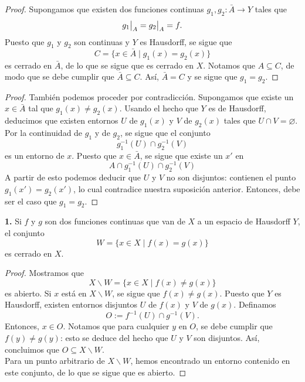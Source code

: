 \documentclass{article}
\newcommand\restr[2]{{%
		\left.\kern-\nulldelimiterspace %
		#1 %
		\vphantom{\big|} %
		\right|_{#2} %
}}
\begin{document}
\begin{proof}
Supongamos que existen dos funciones continuas $g_{1}, g_{2}: \bar{A} \rightarrow Y$ tales que
	$$ \restr{g_{1}}{A} = \restr{g_{2}}{A} = f.  $$
	Puesto que $g_{1}$ y $g_{2}$ son continuas y $Y$ es Hausdorff, se sigue que
	$$ C = \{ x \in \bar{A} \mid g_{1}(x) = g_{2}(x) \} $$
	es cerrado en $\bar{A}$, de lo que se sigue que es cerrado en $X$. Notamos que $A \subseteq C$, de modo que se debe cumplir que $\bar{A} \subseteq C$. Así, $\bar{A} = C$ y se sigue que $g_{1} = g_{2}$.
\end{proof}

\begin{proof}
	También podemos proceder por contradicción. Supongamos que existe un $x \in \bar{A}$ tal que $g_{1}(x) \neq g_{2}(x)$. Usando el hecho que $Y$ es de Hausdorff, deducimos que existen entornos $U$ de $g_{1}(x)$ y $V$ de $g_{2}(x)$ tales que $U \cap V = \varnothing$. Por la continuidad de $g_{1}$ y de $g_{2}$, se sigue que el conjunto
	$$ g_{1}^{-1}(U) \cap g_{2}^{-1}(V) $$
	es un entorno de $x$. Puesto que $x \in \bar{A}$, se sigue que existe un $x'$ en
	$$ A \cap g_{1}^{-1}(U) \cap g_{2}^{-1}(V) $$
	A partir de esto podemos deducir que $U$ y $V$ no son disjuntos: contienen el punto $g_{1}(x') = g_{2}(x')$, lo cual contradice nuestra suposición anterior. Entonces, debe  ser el caso que $g_{1} = g_{2}$. 
\end{proof}
	
\begin{mybox}
	\textbf{1.} Si $f$ y $g$ son dos funciones continuas que van de $X$ a un espacio de Hausdorff $Y$, el conjunto
	$$ W =  \{ x \in X \mid f(x) = g(x)  \} $$
	es cerrado en $X$.
\end{mybox}
\begin{proof}
	Mostramos que 
	$$ X \backslash W = \{ x \in X \mid f(x) \neq g(x) \} $$
	es abierto. Si $x$ está en $X \backslash W$, se sigue que $f(x) \neq g(x)$. Puesto que $Y$ es Hausdorff, existen entornos disjuntos $U$ de $f(x)$ y $V$ de $g(x)$. Definamos 
	$$ O := f^{-1}(U) \cap g^{-1}(V). $$
	Entonces, $x \in O$.  Notamos que para cualquier $y$ en $O$, se debe cumplir que $f(y) \neq g(y)$: esto se deduce del hecho que $U$ y $V$ son disjuntos. Así, concluimos que $O \subseteq X \backslash W$. \\
	Para un punto arbitrario de $X \backslash W$, hemos encontrado un entorno contenido en este conjunto, de lo que se sigue que es abierto. 	
\end{proof}	
\end{document}
